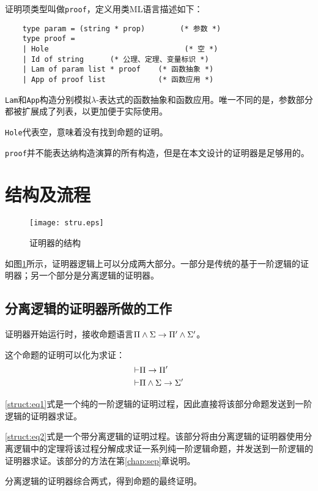 证明项类型叫做\texttt{proof}，定义用类ML语言描述如下：
\begin{verbatim}
    type param = (string * prop)        (* 参数 *)
    type proof =
    | Hole                               (* 空 *)
    | Id of string      (* 公理、定理、变量标识 *)
    | Lam of param list * proof    (* 函数抽象 *)
    | App of proof list            (* 函数应用 *)
\end{verbatim}

\texttt{Lam}和\texttt{App}构造分别模拟$\lambda$-表达式的函数抽象和函数应用。唯一不同的是，参数部分都被扩展成了列表，以更加便于实际使用。

\texttt{Hole}代表空，意味着没有找到命题的证明。

\texttt{proof}并不能表达纳构造演算的所有构造，但是在本文设计的证明器是足够用的。

\section{结构及流程}

\begin{figure}[!htbp]
  \centering
  \texttt{[image: stru.eps]}
  \caption{证明器的结构}
  \label{struct:fig}
\end{figure}

如图\ref{struct:fig}所示，证明器逻辑上可以分成两大部分。一部分是传统的基于一阶逻辑的证明器；另一个部分是分离逻辑的证明器。

\subsection{分离逻辑的证明器所做的工作}
证明器开始运行时，接收命题语言$\Pi \land \Sigma \rightarrow \Pi' \land \Sigma'$。

这个命题的证明可以化为求证：
\begin{eqnarray}
  \vdash & \Pi \rightarrow \Pi' \label{struct:eq1}\\
  \vdash & \Pi \land \Sigma \rightarrow \Sigma' \label{struct:eq2}
\end{eqnarray}

\ref{struct:eq1}式是一个纯的一阶逻辑的证明过程，因此直接将该部分命题发送到一阶逻辑的证明器求证。

\ref{struct:eq2}式是一个带分离逻辑的证明过程。该部分将由分离逻辑的证明器使用分离逻辑中的定理将该过程分解成求证一系列纯一阶逻辑命题，并发送到一阶逻辑的证明器求证。该部分的方法在第\ref{chap:sep}章说明。

分离逻辑的证明器综合两式，得到命题的最终证明。


